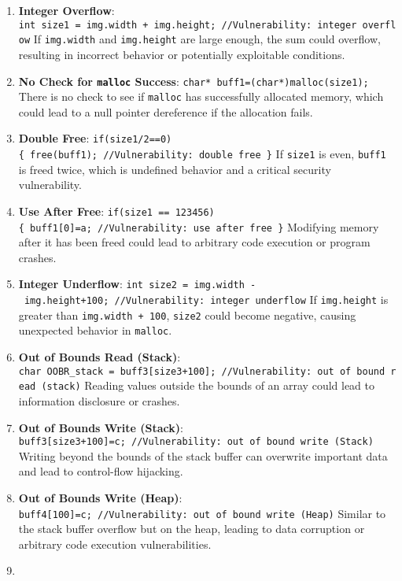 \begin{enumerate}
\def\labelenumi{\arabic{enumi}.}
\item
  \textbf{Integer Overflow}:
  \texttt{int\ size1\ =\ img.width\ +\ img.height;\ //Vulnerability:\ integer\ overflow}
  If \texttt{img.width} and \texttt{img.height} are large enough, the
  sum could overflow, resulting in incorrect behavior or potentially
  exploitable conditions.
\item
  \textbf{No Check for \texttt{malloc} Success}:
  \texttt{char*\ buff1=(char*)malloc(size1);} There is no check to see
  if \texttt{malloc} has successfully allocated memory, which could lead
  to a null pointer dereference if the allocation fails.
\item
  \textbf{Double Free}:
  \texttt{if(size1/2==0)\{\ free(buff1);\ //Vulnerability:\ double\ free\ \}}
  If \texttt{size1} is even, \texttt{buff1} is freed twice, which is
  undefined behavior and a critical security vulnerability.
\item
  \textbf{Use After Free}:
  \texttt{if(size1\ ==\ 123456)\{\ buff1{[}0{]}=\textquotesingle{}a\textquotesingle{};\ //Vulnerability:\ use\ after\ free\ \}}
  Modifying memory after it has been freed could lead to arbitrary code
  execution or program crashes.
\item
  \textbf{Integer Underflow}:
  \texttt{int\ size2\ =\ img.width\ -\ img.height+100;\ //Vulnerability:\ integer\ underflow}
  If \texttt{img.height} is greater than \texttt{img.width\ +\ 100},
  \texttt{size2} could become negative, causing unexpected behavior in
  \texttt{malloc}.
\item
  \textbf{Out of Bounds Read (Stack)}:
  \texttt{char\ OOBR\_stack\ =\ buff3{[}size3+100{]};\ //Vulnerability:\ out\ of\ bound\ read\ (stack)}
  Reading values outside the bounds of an array could lead to
  information disclosure or crashes.
\item
  \textbf{Out of Bounds Write (Stack)}:
  \texttt{buff3{[}size3+100{]}=\textquotesingle{}c\textquotesingle{};\ //Vulnerability:\ out\ of\ bound\ write\ (Stack)}
  Writing beyond the bounds of the stack buffer can overwrite important
  data and lead to control-flow hijacking.
\item
  \textbf{Out of Bounds Write (Heap)}:
  \texttt{buff4{[}100{]}=\textquotesingle{}c\textquotesingle{};\ //Vulnerability:\ out\ of\ bound\ write\ (Heap)}
  Similar to the stack buffer overflow but on the heap, leading to data
  corruption or arbitrary code execution vulnerabilities.
\item

\end{enumerate}
